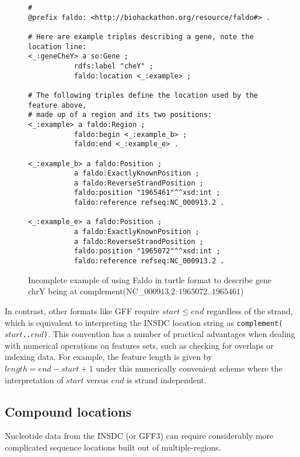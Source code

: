 \begin{figure}
\begin{shaded}
\small
\begin{verbatim}
# 
@prefix faldo: <http://biohackathon.org/resource/faldo#> .

# Here are example triples describing a gene, note the location line:
<_:geneCheY> a so:Gene ;
           rdfs:label "cheY" ;
           faldo:location <_:example> ;

# The following triples define the location used by the feature above,
# made up of a region and its two positions:
<_:example> a faldo:Region ;
           faldo:begin <_:example_b> ;
           faldo:end <_:example_e> .

<_:example_b> a faldo:Position ; 
           a faldo:ExactlyKnownPosition ;
           a faldo:ReverseStrandPosition ;
           faldo:position "1965461"^^xsd:int ;
           faldo:reference refseq:NC_000913.2 .

<_:example_e> a faldo:Position ; 
           a faldo:ExactlyKnownPosition ;
           a faldo:ReverseStrandPosition ;
           faldo:position "1965072"^^xsd:int ;
           faldo:reference refseq:NC_000913.2 .
\end{verbatim}
\end{shaded}
\caption{Incomplete example of using Faldo in turtle format to describe
gene chrY being at complement(NC\_$000913.2:1965072..1965461$)}
\label{fig:insdcComplement}
\end{figure}

In contrast, other formats like GFF require $start \leq end$
regardless of the strand, which is equivalent to interpreting
the INSDC location string as \texttt{complement($start$..$end$)}.
This convention has a number of practical advantages when
dealing with numerical operations on features sets, such as
checking for overlaps or indexing data. For example, the
feature length is given by $length = end - start + 1$ under
this numerically convenient scheme where the interpretation
of $start$ versus $end$ is strand independent.



\subsection*{Compound locations}
Nucleotide data from the INSDC (or GFF3) can require considerably
more complicated sequence locations built out of multiple-regions.

